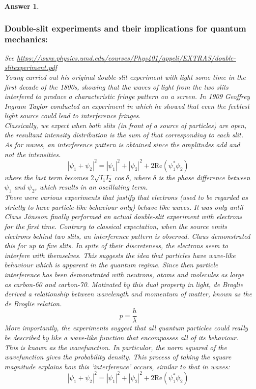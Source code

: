 \documentclass[a4paper]{article}
\newtheorem{ans}{Answer}[subsection]
\theoremstyle{new}
\begin{document}
\begin{ans}\leavevmode
\subsubsection*{Double-slit experiments and their implications for quantum mechanics:}
See \url{https://www.physics.umd.edu/courses/Phys401/appeli/EXTRAS/double-slitexperiment.pdf}\\[5pt]
Young carried out his original double-slit experiment with light some time in the first decade of the 1800s, showing that the waves of light from the two slits interfered to produce a characteristic fringe pattern on a screen. In 1909 Geoffrey Ingram Taylor conducted an experiment in which he showed that even the feeblest light source could lead to interference fringes.\\[5pt]
Classically, we expect when both slits (in front of a source of particles) are open, the resultant intensity distribution is the sum of that corresponding to each slit. As for waves, an interference pattern is obtained since the amplitudes add and not the intensities.
$$|\psi_1+\psi_2|^2=|\psi_1|^2+|\psi_2|^2+2\text{Re}(\psi_1^*\psi_2)$$
where the last term becomes $2\sqrt{I_1I_2}\cos\delta$, where $\delta$ is the phase difference between $\psi_1$ and $\psi_2$, which results in an oscillating term.\\[5pt]
There were various experiments that justify that electrons (used to be regarded as strictly to have particle-like behaviour only) behave like waves. It was only until Claus J\"{o}nsson finally performed an actual double-slit experiment with electrons for the first time. Contrary to classical expectation, when the source emits electrons behind two slits, an interference pattern is observed. Claus demonstrated this for up to five slits. In spite of their discreteness, the electrons seem to interfere with themselves. This suggests the idea that particles have wave-like behaviour which is apparent in the quantum regime. Since then particle interference has been demonstrated with neutrons, atoms and molecules as large as carbon-60 and carbon-70. Motivated by this dual property in light, de Broglie derived a relationship between wavelength and momentum of matter, known as the de Broglie relation.
$$p=\frac{h}{\lambda}$$
More importantly, the experiments suggest that all quantum particles could really be described by like a wave-like function that encompasses all of its behaviour. This is known as the wavefunction. In particular, the norm squared of the wavefunction gives the probability density.  This process of taking the square magnitude explains how this `interference' occurs, similar to that in waves:
$$|\psi_1+\psi_2|^2=|\psi_1|^2+|\psi_2|^2+2\text{Re}(\psi_1^*\psi_2)$$
\newpage

\end{ans}
\end{document}
